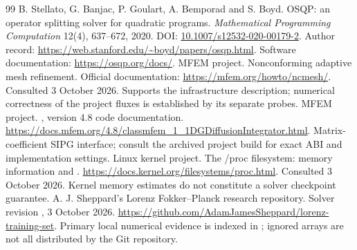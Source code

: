 \begin{thebibliography}{99}
 B. Stellato, G. Banjac, P. Goulart, A. Bemporad and S. Boyd. OSQP: an operator splitting solver for quadratic programs. \emph{Mathematical Programming Computation} 12(4), 637--672, 2020. DOI: \href{https://doi.org/10.1007/s12532-020-00179-2}{10.1007/s12532-020-00179-2}. Author record: \url{https://web.stanford.edu/~boyd/papers/osqp.html}. Software documentation: \url{https://osqp.org/docs/}.
 MFEM project. Nonconforming adaptive mesh refinement. Official documentation: \url{https://mfem.org/howto/ncmesh/}. Consulted 3 October 2026. Supports the infrastructure description; numerical correctness of the project fluxes is established by its separate probes.
 MFEM project. , version 4.8 code documentation. \url{https://docs.mfem.org/4.8/classmfem_1_1DGDiffusionIntegrator.html}. Matrix-coefficient SIPG interface; consult the archived project build for exact ABI and implementation settings.
 Linux kernel project. The /proc filesystem: memory information and . \url{https://docs.kernel.org/filesystems/proc.html}. Consulted 3 October 2026. Kernel memory estimates do not constitute a solver checkpoint guarantee.
 A. J. Sheppard's Lorenz Fokker--Planck research repository. Solver revision , 3 October 2026. \url{https://github.com/AdamJamesSheppard/lorenz-training-set}. Primary local numerical evidence is indexed in ; ignored arrays are not all distributed by the Git repository.
\end{thebibliography}
